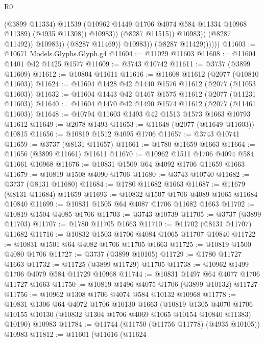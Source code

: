\begin{lexlean}{R0}
\begin{coremodule}
                                      (@3899 @11334)
                                      @11539
                                      (@10962 @1449 @1706 @4074 @584 @11334 @10968 @11389)
                                      (@4935 @11308))
                                    @10983))
                                (@8287 @11515))
                              @10983))
                          (@8287 @11492))
                        @10983))
                    (@8287 @11469))
                  @10983))
              (@8287 @11429))))))
@11603 := @10671 Models.Glyphs.Glyph.g4
@11604 := @11029 @11603
@11608 := @11604 @1401 @42 @1425 @1577
@11609 := @3743 @10742
@11611 := @3737 (@3899 @11609)
@11612 := @10804 @11611
@11616 := @11608 @11612 (@2077 (@10810 @11603))
@11624 := @11604 @1428 @42 @1440 @1576 @11612 (@2077 (@11053 @11603))
@11632 := @11604 @1443 @42 @1467 @1575 @11612 (@2077 (@11231 @11603))
@11640 := @11604 @1470 @42 @1490 @1574 @11612 (@2077 (@11461 @11603))
@11648 := @10794 @11603 @1493 @42 @1513 @1573 @1663 @10793 @11612
@11649 := @2078 @1493
@11653 := @11648 (@2077 (@11649 @11603)) @10815
@11656 := @10819 @1512 @4095 @1706
@11657 := @3743 @10741
@11659 := @3737 (@8131 @11657)
@11661 := @1780 @11659 @1663
@11664 := @11656 (@3899 @11661) @11611
@11670 := @10962 @1511 @1706 @4094 @584 @11661 @10968
@11676 := @10831 @1509 @64 @4092 @1706 @11659 @1663
@11679 := @10819 @1508 @4090 @1706
@11680 := @3743 @10740
@11682 := @3737 (@8131 @11680)
@11684 := @1780 @11682 @1663
@11687 := @11679 (@8131 @11684) @11659
@11693 := @10832 @1507 @1706 @4089 @1065 @11684 @10840
@11699 := @10831 @1505 @64 @4087 @1706 @11682 @1663
@11702 := @10819 @1504 @4085 @1706
@11703 := @3743 @10739
@11705 := @3737 (@3899 @11703)
@11707 := @1780 @11705 @1663
@11710 := @11702 (@8131 @11707) @11682
@11716 := @10832 @1503 @1706 @4084 @1065 @11707 @10840
@11722 := @10831 @1501 @64 @4082 @1706 @11705 @1663
@11725 := @10819 @1500 @4080 @1706
@11727 := @3737 (@3899 @10105)
@11729 := @1780 @11727 @1663
@11732 := @11725 (@3899 @11729) @11705
@11738 := @10962 @1499 @1706 @4079 @584 @11729 @10968
@11744 := @10831 @1497 @64 @4077 @1706 @11727 @1663
@11750 := @10819 @1496 @4075 @1706 (@3899 @10132) @11727
@11756 := @10962 @1308 @1706 @4074 @584 @10132 @10968
@11778 := @10831
    @1306
    @64
    @4072
    @1706
    @10130
    @1663
    (@10819
      @1305
      @4070
      @1706
      @10155
      @10130
      (@10832 @1304 @1706 @4069 @1065 @10154 @10840 @11383)
      @10190)
    @10983
@11784 := @11744 (@11750 (@11756 @11778) (@4935 @10105)) @10983
@11812 := @11601
    (@11616
      (@11624

\end{coremodule}
\end{lexlean}
